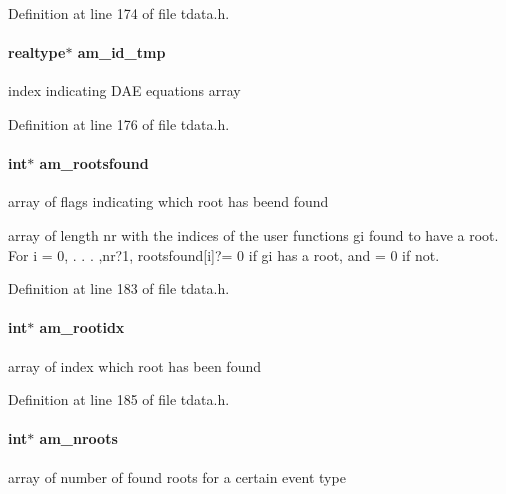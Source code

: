 Definition at line 174 of file tdata.\+h.

\hypertarget{struct_temp_data_af4cb4bb8ec3396d46cca992ad83ae137}{}
\paragraph[{am\+\_\+id\+\_\+tmp}]{\setlength{\rightskip}{0pt plus 5cm}realtype$\ast$ am\+\_\+id\+\_\+tmp}\label{struct_temp_data_af4cb4bb8ec3396d46cca992ad83ae137}
index indicating D\+A\+E equations array 

Definition at line 176 of file tdata.\+h.

\hypertarget{struct_temp_data_a7aead84117fd84087a23d968ea56b542}{}
\paragraph[{am\+\_\+rootsfound}]{\setlength{\rightskip}{0pt plus 5cm}int$\ast$ am\+\_\+rootsfound}\label{struct_temp_data_a7aead84117fd84087a23d968ea56b542}
array of flags indicating which root has beend found

array of length nr with the indices of the user functions gi found to have a root. For i = 0, . . . ,nr?1, rootsfound\mbox{[}i\mbox{]}?= 0 if gi has a root, and = 0 if not. 

Definition at line 183 of file tdata.\+h.

\hypertarget{struct_temp_data_a360ea220e712750c92bd3fc8b56230e2}{}
\paragraph[{am\+\_\+rootidx}]{\setlength{\rightskip}{0pt plus 5cm}int$\ast$ am\+\_\+rootidx}\label{struct_temp_data_a360ea220e712750c92bd3fc8b56230e2}
array of index which root has been found 

Definition at line 185 of file tdata.\+h.

\hypertarget{struct_temp_data_af329293bdb28f52dcaeb04355dc5c69e}{}
\paragraph[{am\+\_\+nroots}]{\setlength{\rightskip}{0pt plus 5cm}int$\ast$ am\+\_\+nroots}\label{struct_temp_data_af329293bdb28f52dcaeb04355dc5c69e}
array of number of found roots for a certain event type 


